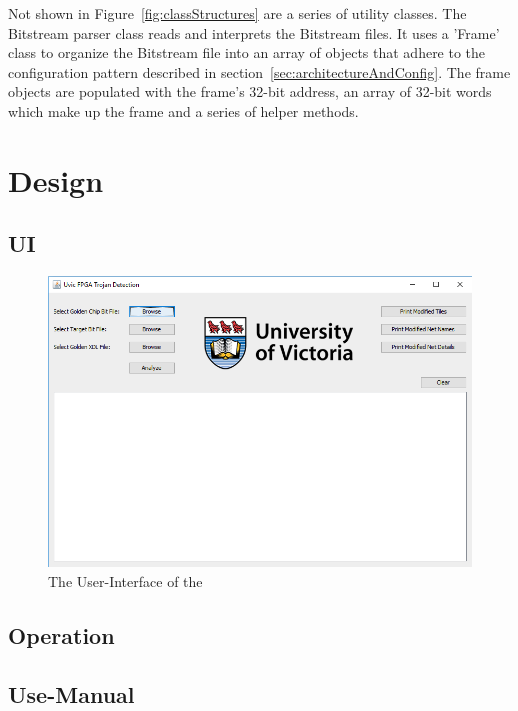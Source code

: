 Not shown in Figure~\ref{fig:classStructures} are a series of utility classes.
The \gls{Bitstream} parser class reads and interprets the \gls{Bitstream} files. 
It uses a 'Frame' class to organize the \gls{Bitstream} file into an array of objects that adhere to the configuration pattern described in section~\ref{sec:architectureAndConfig}.
The frame objects are populated with the frame's 32-bit address, an array of 32-bit words which make up the frame and a series of helper methods.
\section{Design}
\subsection{\acrfull{UI}}
\begin{figure}
\centering
\includegraphics[width=0.7\linewidth]{Figures/UI}
\caption[The User-Interface of the \Name]{The User-Interface of the \Name}
\label{fig:UI}
\end{figure}

\subsection{Operation}
\subsection{Use-Manual}
